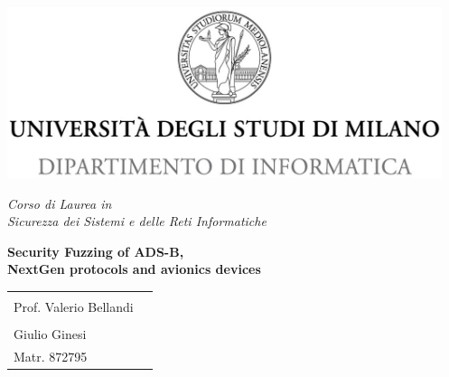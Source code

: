 \begin{titlepage}
  \begin{center}
    \includegraphics[height=5.0cm]{images/minerva_2013_DI.jpg}

    \vspace*{.4cm}
    {\Large
      \emph{Corso di Laurea in\\[.3cm]
         Sicurezza dei Sistemi e delle Reti Informatiche}
    }
    \vfill
    \begin{LARGE}
      \textbf{Security Fuzzing of ADS-B,\\[.4cm]NextGen protocols and avionics devices}
    \end{LARGE}

    \vfill
    \begin{minipage}{.99\linewidth}
      \begin{tabular}{l r}
        \begin{minipage}{.5\linewidth}
          \begin{flushleft}
            {\large
              RELATORE\\[.2cm]
              Prof. Valerio Bellandi\\[.6cm]

            }

          \end{flushleft}
        \end{minipage}
        &
        \begin{minipage}{.45\linewidth}
          \begin{flushright}
            {\large
              TESI DI LAUREA DI\\[.3cm]
              Giulio Ginesi\\[.45cm]
              Matr. 872795
            }
          \end{flushright}
        \end{minipage}
      \end{tabular}
    \end{minipage}


\end{center}
\end{titlepage}
